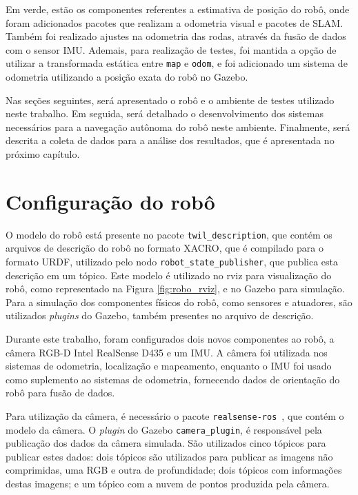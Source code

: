 \documentclass[repeatfields,xlists,xpacks,oneside,yearsonly]{ufrgscca}
\begin{document}
Em verde, estão os componentes referentes a estimativa de posição do
robô, onde foram adicionados pacotes que realizam a odometria visual
e pacotes de SLAM. Também foi realizado ajustes na odometria das
rodas, através da fusão de dados com o sensor IMU. Ademais, para
realização de testes, foi mantida a opção de utilizar a transformada
estática entre \texttt{map} e \texttt{odom}, e foi adicionado um
sistema de odometria utilizando a posição exata do robô no Gazebo.

Nas seções seguintes, será apresentado o robô e o ambiente de testes
utilizado neste trabalho. Em seguida, será detalhado o
desenvolvimento dos sistemas necessários para a navegação autônoma do
robô neste ambiente. Finalmente, será descrita a coleta de dados para
a análise dos resultados, que é apresentada no próximo capítulo.

\section{Configuração do robô}

O modelo do robô está presente no pacote \texttt{twil\_description},
que contém os arquivos de descrição do robô no formato XACRO, que é
compilado para o formato URDF, utilizado pelo nodo
\texttt{robot\_state\_publisher}, que publica esta descrição em um
tópico. Este modelo é utilizado no rviz para visualização do robô,
como representado na Figura \ref{fig:robo_rviz}, e no Gazebo para
simulação. Para a simulação dos componentes físicos do robô, como
sensores e atuadores, são utilizados \textit{plugins} do Gazebo,
também presentes no arquivo de descrição.

Durante este trabalho, foram configurados dois novos componentes ao
robô, a câmera RGB-D Intel RealSense D435 e um IMU. A câmera foi
utilizada nos sistemas de odometria, localização e mapeamento,
enquanto o IMU foi usado como suplemento ao sistemas de odometria,
fornecendo dados de orientação do robô para fusão de dados.

Para utilização da câmera, é necessário o pacote
\texttt{realsense-ros}~\cite{realsense_ros}, que contém o modelo da
câmera. O \textit{plugin} do Gazebo \texttt{camera\_plugin}, é
responsável pela publicação dos dados da câmera simulada. São
utilizados cinco tópicos para publicar estes dados: dois tópicos são
utilizados para publicar as imagens não comprimidas, uma RGB e outra
de profundidade; dois tópicos com informações destas imagens; e um
tópico com a nuvem de pontos produzida pela câmera.
\end{document}
